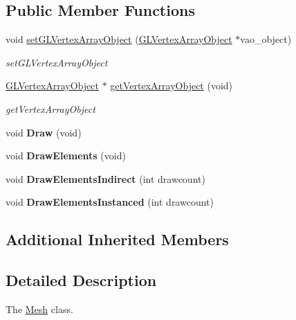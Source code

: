 \subsection*{Public Member Functions}
\begin{DoxyCompactItemize}
\item 
void \hyperlink{classEngine_1_1Mesh_a91b3647bd0d2c7c826e3b74d3748c05d}{set\+G\+L\+Vertex\+Array\+Object} (\hyperlink{classEngine_1_1GLVertexArrayObject}{G\+L\+Vertex\+Array\+Object} $\ast$vao\+\_\+object)
\begin{DoxyCompactList}\small\item\em set\+G\+L\+Vertex\+Array\+Object \end{DoxyCompactList}\item 
\hyperlink{classEngine_1_1GLVertexArrayObject}{G\+L\+Vertex\+Array\+Object} $\ast$ \hyperlink{classEngine_1_1Mesh_a3b1be4f7909621d4bb2385907a10a568}{get\+Vertex\+Array\+Object} (void)
\begin{DoxyCompactList}\small\item\em get\+Vertex\+Array\+Object \end{DoxyCompactList}\item 
\hypertarget{classEngine_1_1Mesh_a83800bea9663aef8eeb9bc343b5a55ca}{}void {\bfseries Draw} (void)\label{classEngine_1_1Mesh_a83800bea9663aef8eeb9bc343b5a55ca}

\item 
\hypertarget{classEngine_1_1Mesh_a5c1bc4e3fec668c7802a3d0192e81586}{}void {\bfseries Draw\+Elements} (void)\label{classEngine_1_1Mesh_a5c1bc4e3fec668c7802a3d0192e81586}

\item 
\hypertarget{classEngine_1_1Mesh_ac3c6ca7b99072f370be0f845307792f7}{}void {\bfseries Draw\+Elements\+Indirect} (int drawcount)\label{classEngine_1_1Mesh_ac3c6ca7b99072f370be0f845307792f7}

\item 
\hypertarget{classEngine_1_1Mesh_a7f360c77bda20f2744eb25b67d6ad467}{}void {\bfseries Draw\+Elements\+Instanced} (int drawcount)\label{classEngine_1_1Mesh_a7f360c77bda20f2744eb25b67d6ad467}

\end{DoxyCompactItemize}
\subsection*{Additional Inherited Members}


\subsection{Detailed Description}
The \hyperlink{classEngine_1_1Mesh}{Mesh} class. 


